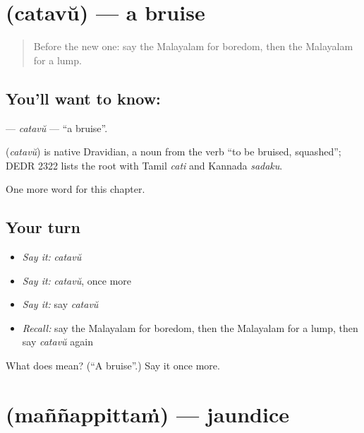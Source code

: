 \section[\texorpdfstring{\ml{ചതവ്} (catavŭ)}{ചതവ് (catavŭ)}]{ (catavŭ) — a bruise}

\label{lesson:ML-C275-catavu}



\begin{quote}
Before the new one: say the Malayalam for boredom, then the Malayalam for a lump.
\end{quote}

\subsection*{You'll want to know: }
\textbf{} — \emph{catavŭ} — \textquotedblleft{}a bruise\textquotedblright{}.

\begin{cousinweb}
\textbf{} (\emph{catavŭ}) is native Dravidian, a noun from the verb \textquotedblleft{}to be bruised, squashed\textquotedblright{}; DEDR 2322 lists the root with Tamil \emph{cati} and Kannada \emph{sadaku}.
\end{cousinweb}

\begin{grammarlens}[title={What you've built}]
One more word for this chapter.
\end{grammarlens}

\subsection*{Your turn}
\begin{itemize}
\raggedright
  \item \emph{Say it:} \emph{catavŭ}
  \item \emph{Say it:} \emph{catavŭ}, once more
  \item \emph{Say it:} say \emph{catavŭ}
  \item \emph{Recall:} say the Malayalam for boredom, then the Malayalam for a lump, then say \emph{catavŭ} again
\end{itemize}

\begin{tcolorbox}[breakable,colback=teal!4,colframe=teal!35!black,title={Before you move on}]
What does  mean? (\textquotedblleft{}A bruise\textquotedblright{}.) Say it once more.
\end{tcolorbox}
\section[\texorpdfstring{\ml{മഞ്ഞപ്പിത്തം} (maññappittaṁ)}{മഞ്ഞപ്പിത്തം (maññappittaṁ)}]{ (maññappittaṁ) — jaundice}

